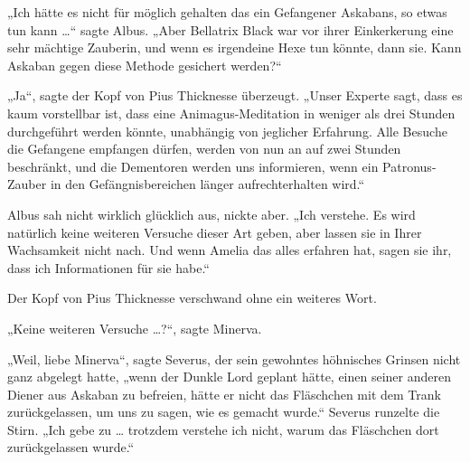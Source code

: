 „Ich hätte es nicht für möglich gehalten das ein Gefangener Askabans, so etwas tun kann …“ sagte Albus.
„Aber Bellatrix Black war vor ihrer Einkerkerung eine sehr mächtige Zauberin, und wenn es irgendeine Hexe tun könnte, dann sie. Kann Askaban gegen diese Methode gesichert werden?“

„Ja“, sagte der Kopf von Pius Thicknesse überzeugt.
„Unser Experte sagt, dass es kaum vorstellbar ist, dass eine Animagus-Meditation in weniger als drei Stunden durchgeführt werden könnte, unabhängig von jeglicher Erfahrung. Alle Besuche die Gefangene empfangen dürfen, werden von nun an auf zwei Stunden beschränkt, und die Dementoren werden uns informieren, wenn ein Patronus-Zauber in den Gefängnisbereichen länger aufrechterhalten wird.“

Albus sah nicht wirklich glücklich aus, nickte aber.
„Ich verstehe. Es wird natürlich keine weiteren Versuche dieser Art geben, aber lassen sie in Ihrer Wachsamkeit nicht nach. Und wenn Amelia das alles erfahren hat, sagen sie ihr, dass ich Informationen für sie habe.“

Der Kopf von Pius Thicknesse verschwand ohne ein weiteres Wort.

„Keine weiteren Versuche …?“, sagte Minerva.

„Weil, liebe Minerva“, sagte Severus, der sein gewohntes höhnisches Grinsen nicht ganz abgelegt hatte, „wenn der Dunkle Lord geplant hätte, einen seiner anderen Diener aus Askaban zu befreien, hätte er nicht das Fläschchen mit dem Trank zurückgelassen, um uns zu sagen, wie es gemacht wurde.“ Severus runzelte die Stirn.
„Ich gebe zu … trotzdem verstehe ich nicht, warum das Fläschchen dort zurückgelassen wurde.“

